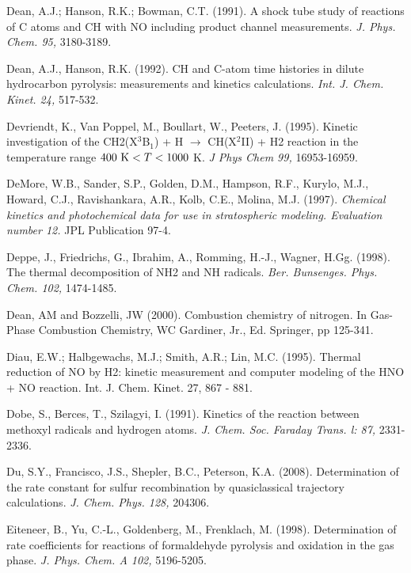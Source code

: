 \documentclass[12pt,landscape]{article}
\newcounter{reaction}
\newcounter{photo}
\begin{document}
Dean, A.J.; Hanson, R.K.; Bowman, C.T. (1991). A shock tube study of reactions of C atoms and CH with NO including product channel measurements.  {\em J. Phys. Chem. 95,} 3180-3189.

Dean, A.J., Hanson, R.K. (1992).  CH and C-atom time histories in dilute hydrocarbon pyrolysis: measurements and kinetics calculations.  {\em Int. J. Chem. Kinet. 24,} 517-532.

Devriendt, K., Van Poppel, M., Boullart, W., Peeters, J. (1995).  Kinetic investigation of the CH2(X$^3$B$_1$) + H $\rightarrow$ CH(X$^2$II) + H2 reaction in the temperature range $400{\rm~K}<T<1000$ K. {\em J Phys Chem 99,} 16953-16959.

DeMore, W.B., Sander, S.P., Golden, D.M., Hampson, R.F., Kurylo, M.J., Howard, C.J., Ravishankara, A.R., Kolb, C.E., Molina, M.J. (1997). {\em Chemical kinetics and photochemical data for use in stratospheric modeling. Evaluation number 12.}  JPL Publication 97-4.

Deppe, J., Friedrichs, G., Ibrahim, A., Romming, H.-J., Wagner, H.Gg. (1998). The thermal decomposition of NH2 and NH radicals.   {\em Ber. Bunsenges. Phys. Chem. 102,} 1474-1485.

Dean, AM and Bozzelli, JW (2000). Combustion chemistry of nitrogen. In Gas-Phase Combustion Chemistry, WC Gardiner, Jr., Ed. Springer, pp 125-341.

Diau, E.W.; Halbgewachs, M.J.; Smith, A.R.; Lin, M.C. (1995). Thermal reduction of NO by H2: kinetic measurement and computer modeling of the HNO + NO reaction.  Int. J. Chem. Kinet. 27, 867 - 881.  

Dobe, S., Berces, T., Szilagyi, I. (1991). Kinetics of the reaction between methoxyl radicals and hydrogen atoms. {\em J. Chem. Soc. Faraday Trans. l:  87,} 2331-2336.

 Du, S.Y., Francisco, J.S., Shepler, B.C., Peterson, K.A. (2008). Determination of the rate constant for sulfur recombination by quasiclassical trajectory calculations. {\em J. Chem. Phys. 128,} 204306.

Eiteneer, B., Yu, C.-L., Goldenberg, M., Frenklach, M. (1998). Determination of rate coefficients for reactions of formaldehyde pyrolysis and oxidation in the gas phase. {\em J. Phys. Chem. A  102,} 5196-5205.
\end{document}
